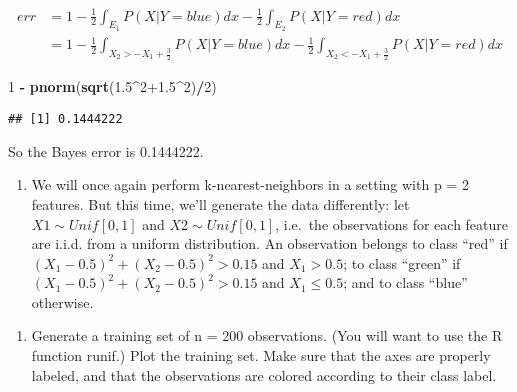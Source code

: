 \documentclass[]{article}
\newenvironment{Shaded}{\begin{snugshade}}{\end{snugshade}}
\newcommand{\DecValTok}[1]{\textcolor[rgb]{0.00,0.00,0.81}{#1}}
\newcommand{\FloatTok}[1]{\textcolor[rgb]{0.00,0.00,0.81}{#1}}
\newcommand{\KeywordTok}[1]{\textcolor[rgb]{0.13,0.29,0.53}{\textbf{#1}}}
\newcommand{\NormalTok}[1]{#1}
\newcommand{\OperatorTok}[1]{\textcolor[rgb]{0.81,0.36,0.00}{\textbf{#1}}}
\newcommand{\StringTok}[1]{\textcolor[rgb]{0.31,0.60,0.02}{#1}}
\providecommand{\tightlist}{%
  \setlength{\itemsep}{0pt}\setlength{\parskip}{0pt}}
\begin{document}
\[
  \begin{align*}
    err &= 1 - \frac{1}{2}\int_{E_1} P(X|Y=blue)dx - \frac{1}{2}\int_{E_2} P(X|Y=red)dx \\
        &= 1 - \frac{1}{2}\int_{X_2 >-X_1 + \frac{3}{2}} P(X|Y=blue)dx - \frac{1}{2}\int_{X_2 <-X_1+\frac{3}{2}} P(X|Y=red)dx
  \end{align*}
  \]

\begin{Shaded}
\begin{Highlighting}[]
\DecValTok{1} \OperatorTok{-}\StringTok{ }\KeywordTok{pnorm}\NormalTok{(}\KeywordTok{sqrt}\NormalTok{(}\FloatTok{1.5}\OperatorTok{^}\DecValTok{2}\FloatTok{+1.5}\OperatorTok{^}\DecValTok{2}\NormalTok{)}\OperatorTok{/}\DecValTok{2}\NormalTok{)}
\end{Highlighting}
\end{Shaded}

\begin{verbatim}
## [1] 0.1444222
\end{verbatim}

So the Bayes error is 0.1444222.

\begin{enumerate}
\def\labelenumi{\arabic{enumi}.}
\setcounter{enumi}{1}
\tightlist
\item
  We will once again perform k-nearest-neighbors in a setting with p = 2
  features. But this time, we'll generate the data differently: let
  \(X1 \sim Unif[0, 1]\) and \(X2 \sim Unif[0, 1]\), i.e.~the
  observations for each feature are i.i.d. from a uniform distribution.
  An observation belongs to class ``red'' if
  \((X_1 - 0.5)^2 + (X_2 - 0.5)^2 > 0.15\) and \(X_1 > 0.5\); to class
  ``green'' if \((X_1 - 0.5)^2 + (X_2 - 0.5)^2 > 0.15\) and
  \(X_1 \leq 0.5\); and to class ``blue'' otherwise.
\end{enumerate}

\begin{enumerate}
\def\labelenumi{(\alph{enumi})}
\tightlist
\item
  Generate a training set of n = 200 observations. (You will want to use
  the R function runif.) Plot the training set. Make sure that the axes
  are properly labeled, and that the observations are colored according
  to their class label.
\end{enumerate}
\end{document}
